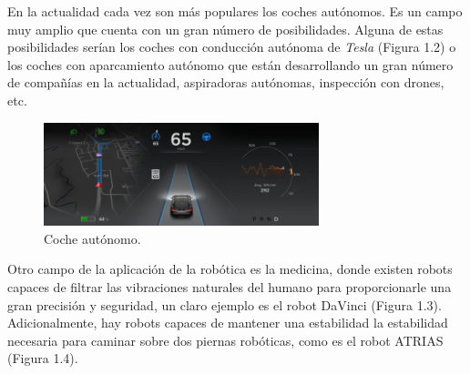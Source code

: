 \documentclass[a4paper, 12pt]{book}
\begin{document}
En la actualidad cada vez son más populares los coches autónomos. Es un campo muy amplio que cuenta con un gran número de posibilidades. Alguna de estas posibilidades serían los coches con conducción autónoma de \textit{Tesla}  (Figura 1.2) o los coches con aparcamiento autónomo que están desarrollando un gran número de compañías en la actualidad, aspiradoras autónomas, inspección con drones, etc.

\begin{figure}[H]
	\centering
    \includegraphics[width=8cm, keepaspectratio]{img/coche}
    \caption{Coche autónomo.}
    \label{figura:coche_autonomo}
\end{figure}

Otro campo de la aplicación de la robótica es la medicina, donde existen robots capaces de filtrar las vibraciones naturales del humano para proporcionarle una gran precisión y seguridad, un claro ejemplo es el robot DaVinci (Figura 1.3). Adicionalmente, hay robots capaces de mantener una estabilidad la estabilidad necesaria para caminar sobre dos piernas robóticas, como es el robot ATRIAS (Figura 1.4).
\end{document}
